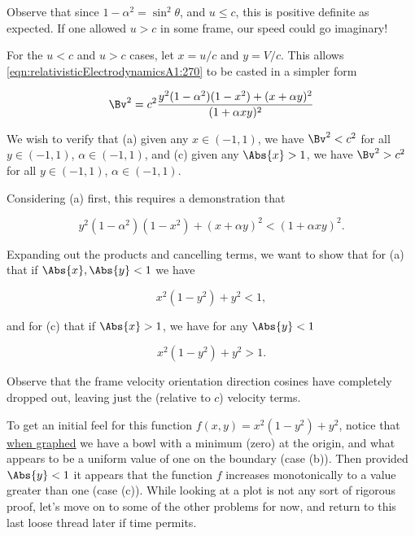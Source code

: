 Observe that since $1 - \alpha^2 = \sin^2\theta$, and $u \le c$, this is positive definite as expected.  If one allowed $u > c$ in some frame, our speed could go imaginary!

For the $u < c$ and $u > c$ cases, let $x = u/c$ and $y = V/c$.  This allows \ref{eqn:relativisticElectrodynamicsA1:270} to be casted in a simpler form

\begin{equation}\label{eqn:relativisticElectrodynamicsA1:270e}
\Bv^2 = c^2 \frac{y^2 (1 - \alpha^2)(1 - x^2) + (x + \alpha y)^2}{ (1 + \alpha x y)^2 }
\end{equation}

We wish to verify that (a) given any $x \in (-1,1)$, we have $\Bv^2 < c^2$ for all $y \in (-1,1)$, $\alpha \in (-1,1)$, and (c) given any $\Abs{x} > 1$, we have $\Bv^2 > c^2$ for all $y \in (-1,1)$, $\alpha \in (-1,1)$.

Considering (a) first, this requires a demonstration that 

\begin{equation}\label{eqn:relativisticElectrodynamicsA1:280}
y^2 (1 - \alpha^2)(1 - x^2) + (x + \alpha y)^2 < (1 + \alpha x y)^2 .
\end{equation}

Expanding out the products and cancelling terms, we want to show that for (a) that if $\Abs{x},\Abs{y} < 1$ we have

\begin{equation}\label{eqn:relativisticElectrodynamicsA1:290a}
x^2 (1 - y^2) + y^2 < 1,
\end{equation}

and for (c) that if $\Abs{x} > 1$, we have for any $\Abs{y} < 1$

\begin{equation}\label{eqn:relativisticElectrodynamicsA1:290c}
x^2 (1 - y^2) + y^2 > 1.
\end{equation}

Observe that the frame velocity orientation direction cosines have completely dropped out, leaving just the (relative to $c$) velocity terms.

To get an initial feel for this function $f(x,y) = x^2 (1 - y^2) + y^2$, notice that \href{http://goo.gl/5AnNF}{when graphed} we have a bowl with a minimum (zero) at the origin, and what appears to be a uniform value of one on the boundary (case (b)).  Then provided $\Abs{y} < 1$ it appears that the function $f$ increases monotonically to a value greater than one (case (c)).  While looking at a plot is not any sort of rigorous proof, let's move on to some of the other problems for now, and return to this last loose thread later if time permits.

